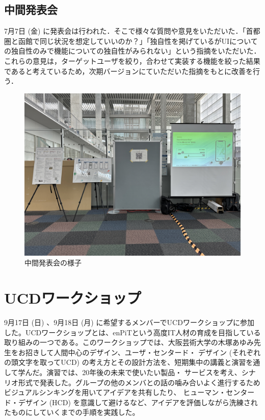 \subsection{中間発表会}
7月7日 (金) に発表会は行われた．そこで様々な質問や意見をいただいた．「首都圏と函館で同じ状況を想定していいのか？」「独自性を掲げているがUIについての独自性のみで機能についての独自性がみられない」という指摘をいただいた．これらの意見は，ターゲットユーザを絞り，合わせて実装する機能を絞った結果であると考えているため，次期バージョンにていただいた指摘をもとに改善を行う．

\begin{figure}[htbp]
    \centering
    \includegraphics[width=12cm]{images/mid_presentation.png}
    \caption{中間発表会の様子}
    \label{fig:mid_presentation}
\end{figure}

\section{UCDワークショップ}
 9月17日 (日) 、9月18日 (月) に希望するメンバーでUCDワークショップに参加した。UCDワークショップとは、enPiTという高度IT人材の育成を目指している
取り組みの一つである。このワークショップでは、大阪芸術大学の木塚あゆみ先生をお招きして人間中心のデザイン、ユーザ・センタード・
デザイン (それぞれの頭文字を取ってUCD) の考え方とその設計方法を、短期集中の講義と演習を通して学んだ。演習では、20年後の未来で使いたい製品・
サービスを考え、シナリオ形式で発表した。グループの他のメンバとの話の噛み合いよく進行するためビジュアルシンキングを用いてアイデアを共有したり、
ヒューマン・センタード・デザイン (HCD) を意識して避けるなど、アイデアを評価しながら洗練されたものにしていくまでの手順を実践した。

